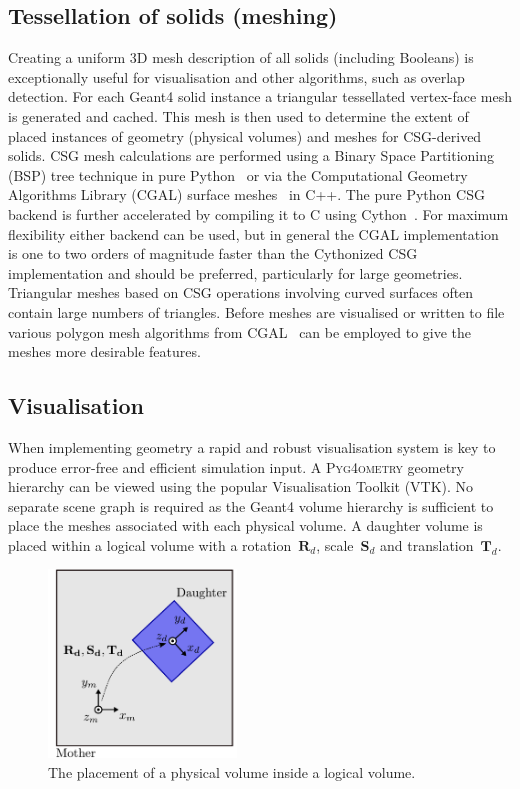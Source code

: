 \documentclass[final,5p,times,twocolumn]{elsarticle}
\newcommand{\PYGEOMETRY}{\textsc{Pyg4ometry}}
\begin{document}
\subsection{Tessellation of solids (meshing)}
Creating a uniform 3D mesh description of all solids (including Booleans) is exceptionally useful for visualisation and other algorithms, such as overlap
detection. For each Geant4 solid instance a triangular tessellated vertex-face mesh is generated and cached. This mesh is then used to determine the extent
of placed instances of geometry (physical volumes) and meshes for CSG-derived solids. CSG mesh calculations are performed using a Binary Space Partitioning
(BSP) tree technique in pure Python~\cite{pycsg} or via the Computational
Geometry Algorithms Library (CGAL) surface meshes~\cite{cgal:bsmf-sm-20b}
in C++. The pure Python CSG backend is further accelerated by compiling it
to C using Cython~\cite{cython}.
For maximum flexibility either backend can be used, but in general the
CGAL implementation is one to two orders of magnitude faster than the
Cythonized CSG implementation and should be preferred, particularly for large geometries.
Triangular meshes based on CSG operations involving curved surfaces often contain large numbers of triangles. Before meshes are visualised or written to file
various polygon mesh algorithms  from CGAL~\cite{cgal:lty-pmp-20b} can be employed to give the meshes more desirable features.


\subsection{Visualisation} \label{sec:visualisation}
When implementing geometry a rapid and robust visualisation system is key to produce error-free and efficient simulation input.
A  \PYGEOMETRY{} geometry hierarchy can be viewed using the popular Visualisation Toolkit (VTK). No separate scene graph is required as the Geant4
volume hierarchy is sufficient to place the meshes associated with each physical volume. A daughter volume is placed within a logical volume with a
rotation~$\mathbf{R}_d$, scale~$\mathbf{S}_d$ and translation~$\mathbf{T}_d$.

\begin{figure}[htb!]
\begin{center}
\includegraphics[width=5cm]{./diagrams/lvToPv.pdf}
\caption{The placement of a physical volume inside a logical volume.}
\label{fig:lvToPv}
\end{center}
\end{figure}
\end{document}
